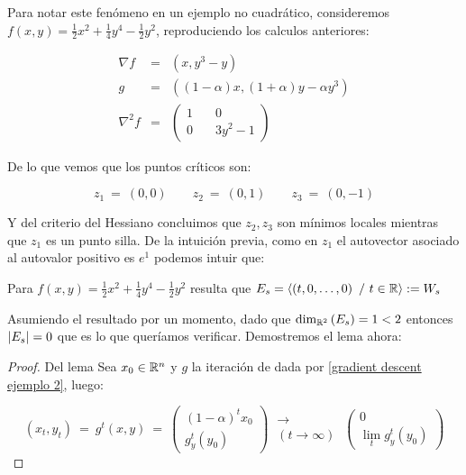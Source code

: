 \begin{example}
	
	Para notar este fen\'omeno en un ejemplo no cuadr\'atico, consideremos $f(x, y) = \frac{1}{2}x^2 + \frac{1}{4}y^4 - \frac{1}{2}y^2$, reproduciendo los calculos anteriores:
	
	\label{gradient descent ejemplo 2}
	\begin{equation}
	\begin{aligned}
	\nabla f & = & \left(x, y^3 -y\right) \\
	g & = & \left((1-\alpha)x, (1+\alpha)y - \alpha y^3\right) \\
	\nabla^2 f & = & \left(
	\begin{aligned}
	1 & \quad 0 \\
	0 & \quad 3y^2-1
	\end{aligned}
	\right) 
	\end{aligned}
	\end{equation}
	
	De lo que vemos que los puntos cr\'iticos son:
	
	\[
	z_1 \ = \ (0,0) \qquad z_2 \ = \ (0,1) \qquad z_3 \ = \ (0,-1)
	\]
	
	Y del criterio del Hessiano concluimos que $z_2, z_3$ son m\'inimos locales mientras que $z_1$ es un punto silla. De la intuici\'on previa, como en $z_1$ el autovector asociado al autovalor positivo es $e^1$ podemos intuir que:
	
	\begin{lemma}
		Para $f(x, y) = \frac{1}{2}x^2 + \frac{1}{4}y^4 - \frac{1}{2}y^2$ resulta que $E_s = \left\langle \left(t, 0, \dots, 0\right) \ / \ t \in {\mathbb{R}}\right\rangle:= W_s$
	\end{lemma}
	
	Asumiendo el resultado por un momento, dado que $\dim_{{\mathbb{R}}^2}\left(E_s\right) =1 < 2$ entonces $\left\lvert E_s\right\rvert = 0$ que es lo que quer\'iamos verificar. Demostremos el lema ahora:
	
	\begin{proof}{Del lema}
		Sea $x_0 \in {\mathbb{R}}^n$ y $g$ la iteraci\'on de \dg dada por \ref{gradient descent ejemplo 2}, luego:
		
		\begin{equation*}
		(x_t, y_t) \ = \ g^t(x,y) \ = \ \left(\begin{aligned}
		(1-\alpha)^tx_0 \\
		g_y^t(y_0)
		\end{aligned}\right) \ \substack{\longrightarrow \\ \left(t \rightarrow \infty\right)} \ \left(\begin{aligned}
		0 \\
		\lim\limits_t g_y^t(y_0)
		\end{aligned}\right)
		\end{equation*}
		

\end{proof}
\end{example}
